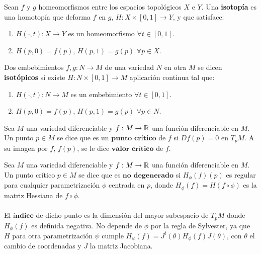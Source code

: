 \begin{definicion} Sean $f$ y $g$ homeomorfismos entre los espacios topológicos $X$ e $Y$. Una \textbf{isotopía} es una homotopía que deforma $f$ en $g$, $H: X \times [0,1] \rightarrow Y$, y que satisface:
	\begin{enumerate}
		\item $H(\cdot, t) : X \rightarrow Y$ es un homeomorfismo $\forall t \in [0,1]$.
		\item $H(p, 0) = f(p)$, $H(p, 1) = g(p)$ $\forall p \in X$.
	\end{enumerate}
\end{definicion}

\begin{definicion} Dos embebimientos $f,g : N \rightarrow M$ de una variedad $N$ en otra $M$ se dicen \textbf{isotópicos} si existe $H: N \times [0,1] \rightarrow M$ aplicación continua tal que:
	\begin{enumerate}
		\item $H(\cdot, t) : N \rightarrow M$ es un embebimiento $\forall t \in [0,1]$.
		\item $H(p, 0) = f(p)$, $H(p, 1) = g(p)$ $\forall p \in N$.
	\end{enumerate}
\end{definicion}

\begin{definicion} Sea $M$ una variedad diferenciable y $f: M \rightarrow \mathbb{R}$ una función diferenciable en $M$. Un punto $p \in M$ se dice que es un $\textbf{punto crítico}$ de $f$ si $Df(p) = 0$ en $T_pM$. A su imagen por $f$, $f(p)$, se le dice $\textbf{valor crítico}$ de $f$.
\end{definicion}

\begin{definicion} Sea $M$ una variedad diferenciable y $f: M \rightarrow \mathbb{R}$ una función diferenciable en $M$. Un punto crítico $p \in M$ se dice que es $\textbf{no degenerado}$ si $H_\phi(f)(p)$ es regular para cualquier parametrización $\phi$ centrada en $p$, donde $H_\phi(f)=H(f \circ \phi)$ es la matriz Hessiana de $f \circ \phi$.\\ 
\\ El $\textbf{índice}$ de dicho punto es la dimensión del mayor subespacio de $T_pM$ donde $H_\phi(f)$ es definida negativa. No depende de $\phi$ por la regla de Sylvester, ya que $H$ para otra parametrización $\psi$ cumple $H_\psi(f) = J^t(\theta) H_\phi(f) J(\theta)$, con $\theta$ el cambio de coordenadas y $J$ la matriz Jacobiana.
\end{definicion}

